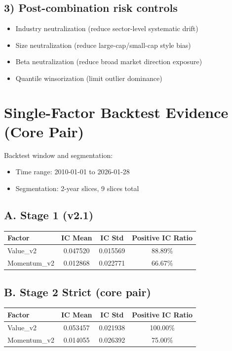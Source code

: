\documentclass[12pt,a4paper]{article}
\begin{document}
\subsection*{3) Post-combination risk controls}
\begin{itemize}
  \item Industry neutralization (reduce sector-level systematic drift)
  \item Size neutralization (reduce large-cap/small-cap style bias)
  \item Beta neutralization (reduce broad market direction exposure)
  \item Quantile winsorization (limit outlier dominance)
\end{itemize}

\section{Single-Factor Backtest Evidence (Core Pair)}
Backtest window and segmentation:
\begin{itemize}
  \item Time range: 2010-01-01 to 2026-01-28
  \item Segmentation: 2-year slices, 9 slices total
\end{itemize}

\subsection*{A. Stage 1 (v2.1)}
\begin{center}
\begin{tabular}{lccc}
\toprule
Factor & IC Mean & IC Std & Positive IC Ratio \\
\midrule
Value\_v2 & 0.047520 & 0.015569 & 88.89\% \\
Momentum\_v2 & 0.012868 & 0.022771 & 66.67\% \\
\bottomrule
\end{tabular}
\end{center}

\subsection*{B. Stage 2 Strict (core pair)}
\begin{center}
\begin{tabular}{lccc}
\toprule
Factor & IC Mean & IC Std & Positive IC Ratio \\
\midrule
Value\_v2 & 0.053457 & 0.021938 & 100.00\% \\
Momentum\_v2 & 0.014055 & 0.026392 & 75.00\% \\
\bottomrule
\end{tabular}
\end{center}
\end{document}
